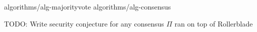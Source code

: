\label{sec:consensus}

{algorithms/alg-majorityvote}
{algorithms/alg-consensus}

\begin{conjecture}[Security]
  TODO: Write security conjecture for any consensus $\Pi$ ran on top of Rollerblade
\end{conjecture}

%
